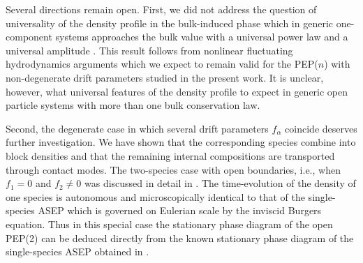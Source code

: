 \documentclass[12pt]{article}
\newcommand{\be}{\begin{equation}}
\newcommand{\ee}{\end{equation}}
\newcommand{\ba}{\begin{array}}
\newcommand{\ea}{\end{array}}
\begin{document}
Several directions remain open. 
First, we did not address the question of universality of the density profile
in the bulk-induced phase which in generic one-component systems approaches the bulk value with a universal power law and a universal
amplitude \cite{Hage01}. This result follows from nonlinear fluctuating
hydrodynamics arguments which we expect to remain valid for the PEP($n$)
with non-degenerate drift parameters studied in the present work. It is unclear, however, what universal features of the density profile
to expect in generic open particle systems with more than one bulk conservation law.

Second,  the degenerate case in which several drift parameters $f_\alpha$
coincide deserves further investigation. We have shown that the
corresponding species combine into block densities and that the remaining
internal compositions are transported through contact modes. The two-species
case with open boundaries, i.e., when $f_1=0$ and $f_2\neq 0$
%
was discussed in detail in \cite{Rako04}. The time-evolution of the density of one species is autonomous and microscopically identical to that of the single-species ASEP which is governed on Eulerian scale by the inviscid Burgers equation. Thus
in this special case the stationary phase diagram of the open PEP(2) can be deduced directly
from the known stationary phase diagram of the single-species ASEP
obtained in \cite{Derr93a,Schu93b}.
\end{document}
